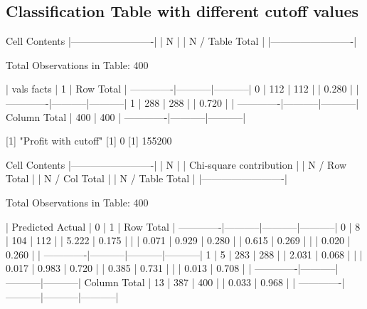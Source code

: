 \documentclass{article}
\begin{document}
\subsection{Classification Table with different cutoff values}
\begin{Schunk}
\begin{Soutput}
   Cell Contents
|-------------------------|
|                       N |
|         N / Table Total |
|-------------------------|

 
Total Observations in Table:  400 

 
             | vals 
       facts |         1 | Row Total | 
-------------|-----------|-----------|
           0 |       112 |       112 | 
             |     0.280 |           | 
-------------|-----------|-----------|
           1 |       288 |       288 | 
             |     0.720 |           | 
-------------|-----------|-----------|
Column Total |       400 |       400 | 
-------------|-----------|-----------|

 
[1] "Profit with cutoff"
[1] 0
[1] 155200

 
   Cell Contents
|-------------------------|
|                       N |
| Chi-square contribution |
|           N / Row Total |
|           N / Col Total |
|         N / Table Total |
|-------------------------|

 
Total Observations in Table:  400 

 
             | Predicted 
      Actual |         0 |         1 | Row Total | 
-------------|-----------|-----------|-----------|
           0 |         8 |       104 |       112 | 
             |     5.222 |     0.175 |           | 
             |     0.071 |     0.929 |     0.280 | 
             |     0.615 |     0.269 |           | 
             |     0.020 |     0.260 |           | 
-------------|-----------|-----------|-----------|
           1 |         5 |       283 |       288 | 
             |     2.031 |     0.068 |           | 
             |     0.017 |     0.983 |     0.720 | 
             |     0.385 |     0.731 |           | 
             |     0.013 |     0.708 |           | 
-------------|-----------|-----------|-----------|
Column Total |        13 |       387 |       400 | 
             |     0.033 |     0.968 |           | 
-------------|-----------|-----------|-----------|


\end{Soutput}
\end{Schunk}
\end{document}
